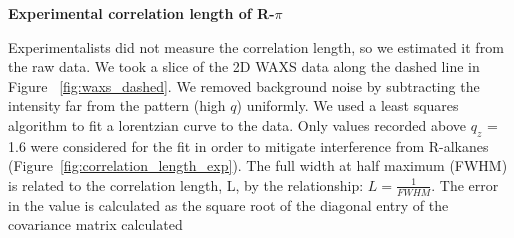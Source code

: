 \documentclass{article}
\begin{document}
  \vspace{1em}
  \begingroup
	\fontsize{14pt}{12pt}\selectfont
	\textbf{\noindent Experimental correlation length of R-$\pi$}
  \endgroup
  
  \vspace{1em}
  Experimentalists did not measure the correlation length, so we estimated it
  from the raw data. We took a slice of the 2D WAXS data along the dashed line in
  Figure ~\ref{fig:waxs_dashed}. We removed background noise by subtracting the
  intensity far from the pattern (high $q$) uniformly. We used a least squares
  algorithm to fit a lorentzian curve to the data. Only values recorded above
  $q_z$ = 1.6 were considered for the fit in order to mitigate interference from
  R-alkanes (Figure~\ref{fig:correlation_length_exp}). The full width at half
  maximum (FWHM) is related to the correlation length, L, by the relationship: $
  L = \frac{1}{FWHM} $. The error in the value is calculated as the square root
  of the diagonal entry of the covariance matrix calculated 
\end{document}
